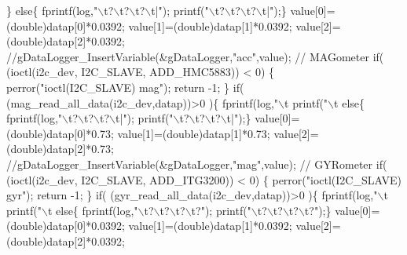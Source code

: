 \begin{DoxyCode}
{{{\textcolor{comment}{        }
\textcolor{comment}{      \}}
\textcolor{comment}{      else\{}
\textcolor{comment}{        fprintf(log,"\(\backslash\)t?\(\backslash\)t?\(\backslash\)t?\(\backslash\)t|"); printf("\(\backslash\)t?\(\backslash\)t?\(\backslash\)t?\(\backslash\)t|");\}}
\textcolor{comment}{      value[0]=(double)datap[0]*0.0392;}
\textcolor{comment}{      value[1]=(double)datap[1]*0.0392;}
\textcolor{comment}{      value[2]=(double)datap[2]*0.0392;}
\textcolor{comment}{      //gDataLogger\_InsertVariable(&gDataLogger,"acc",value);}
\textcolor{comment}{  // MAGometer    }
\textcolor{comment}{      if( (ioctl(i2c\_dev, I2C\_SLAVE, ADD\_HMC5883)) < 0) \{}
\textcolor{comment}{        perror("ioctl(I2C\_SLAVE) mag");}
\textcolor{comment}{        return -1;}
\textcolor{comment}{      \} }
\textcolor{comment}{      if( (mag\_read\_all\_data(i2c\_dev,datap))>0 )\{}
\textcolor{comment}{        fprintf(log,"\(\backslash\)t%
       printf("\(\backslash\)t%
\textcolor{comment}{      else\{}
\textcolor{comment}{        fprintf(log,"\(\backslash\)t?\(\backslash\)t?\(\backslash\)t?\(\backslash\)t|"); printf("\(\backslash\)t?\(\backslash\)t?\(\backslash\)t?\(\backslash\)t|");\}}
\textcolor{comment}{      value[0]=(double)datap[0]*0.73;}
\textcolor{comment}{      value[1]=(double)datap[1]*0.73;}
\textcolor{comment}{      value[2]=(double)datap[2]*0.73;}
\textcolor{comment}{      //gDataLogger\_InsertVariable(&gDataLogger,"mag",value);}
\textcolor{comment}{  // GYRometer    }
\textcolor{comment}{      if( (ioctl(i2c\_dev, I2C\_SLAVE, ADD\_ITG3200)) < 0) \{}
\textcolor{comment}{        perror("ioctl(I2C\_SLAVE) gyr");}
\textcolor{comment}{        return -1;}
\textcolor{comment}{      \} }
\textcolor{comment}{      if( (gyr\_read\_all\_data(i2c\_dev,datap))>0 )\{}
\textcolor{comment}{        fprintf(log,"\(\backslash\)t%
       printf("\(\backslash\)t%
\textcolor{comment}{      else\{}
\textcolor{comment}{        fprintf(log,"\(\backslash\)t?\(\backslash\)t?\(\backslash\)t?\(\backslash\)t?"); printf("\(\backslash\)t?\(\backslash\)t?\(\backslash\)t?\(\backslash\)t?");\}}
\textcolor{comment}{      value[0]=(double)datap[0]*0.0392;}
\textcolor{comment}{      value[1]=(double)datap[1]*0.0392;}
\textcolor{comment}{      value[2]=(double)datap[2]*0.0392;}
}}}}}
\end{DoxyCode}
